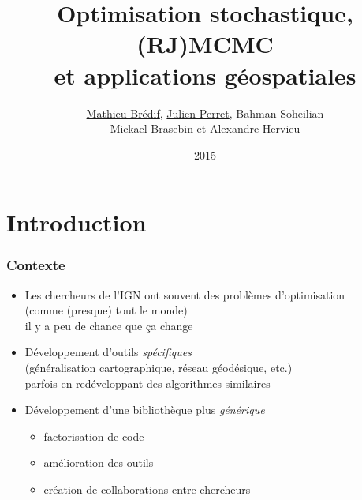 \documentclass{beamer}
\title{Optimisation stochastique, (RJ)MCMC\\ et applications g\'eospatiales}
\author{\underline{Mathieu Brédif}, \underline{Julien Perret}, Bahman Soheilian\\Mickael Brasebin et Alexandre Hervieu}
\institute{IGN}
\date{2015}
\begin{document}
\frame{\titlepage}
 
 
\section{Introduction}

\begin{frame}
\frametitle{Contexte}
\begin{itemize}
\item Les chercheurs de l'IGN ont souvent des probl\`emes d'optimisation\\
(comme (presque) tout le monde)\\
il y a peu de chance que \c{c}a change 
\item D\'eveloppement d'outils \emph{sp\'ecifiques}\\
(g\'en\'eralisation cartographique, r\'eseau g\'eod\'esique, etc.)\\
parfois en redéveloppant des algorithmes similaires
\item D\'eveloppement d'une biblioth\`eque plus \emph{g\'en\'erique}
\begin{itemize}
\item factorisation de code
\item am\'elioration des outils
\item cr\'eation de collaborations entre chercheurs
\end{itemize}
\end{itemize}
\end{frame}
\end{document}
